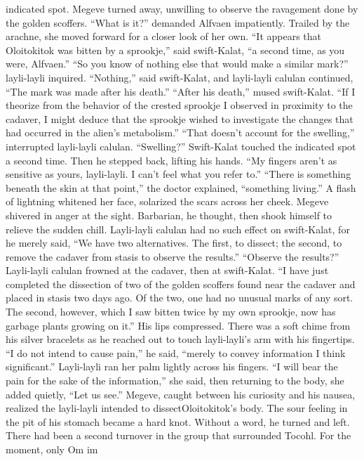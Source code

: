 \documentclass[9pt]{article}
\begin{document}
indicated spot. Megeve turned away, unwilling to observe the ravagement done by the golden scoffers.
“What is it?” demanded Alfvaen impatiently. Trailed by the arachne, she moved forward for a closer
look of her own.
“It appears that Oloitokitok was bitten by a sprookje,” said swift-Kalat, “a second time, as you
were, Alfvaen.”
“So you know of nothing else that would make a similar mark?” layli-layli inquired.
“Nothing,” said swift-Kalat, and layli-layli calulan continued, “The mark was made after his death.”
“After his death,” mused swift-Kalat. “If I theorize from the behavior of the crested sprookje I
observed in proximity to the cadaver, I might deduce that the sprookje wished to investigate the changes
that had occurred in the alien’s metabolism.”
“That doesn’t account for the swelling,” interrupted layli-layli calulan.
“Swelling?” Swift-Kalat touched the indicated spot a second time. Then he stepped back, lifting his
hands. “My fingers aren’t as sensitive as yours, layli-layli. I can’t feel what you refer to.”
“There is something beneath the skin at that point,” the doctor explained, “something living.” A flash
of lightning whitened her face, solarized the scars across her cheek.
Megeve shivered in anger at the sight. Barbarian, he thought, then shook himself to relieve the
sudden chill.
Layli-layli calulan had no such effect on swift-Kalat, for he merely said, “We have two alternatives.
The first, to dissect; the second, to remove the cadaver from stasis to observe the results.”
“Observe the results?” Layli-layli calulan frowned at the cadaver, then at swift-Kalat.
“I have just completed the dissection of two of the golden scoffers found near the cadaver and
placed in stasis two days ago. Of the two, one had no unusual marks of any sort. The second, however,
which I saw bitten twice by my own sprookje, now has garbage plants growing on it.” His lips
compressed. There was a soft chime from his silver bracelets as he reached out to touch layli-layli’s arm
with his fingertips. “I do not intend to cause pain,” he said, “merely to convey information I think
significant.”
Layli-layli ran her palm lightly across his fingers. “I will bear the pain for the sake of the information,”
she said, then returning to the body, she added quietly, “Let us see.”
Megeve, caught between his curiosity and his nausea, realized the layli-layli intended to dissectOloitokitok’s body. The sour feeling in the pit of his stomach became a hard knot. Without a word, he
turned and left.
There had been a second turnover in the group that surrounded Tocohl. For the moment, only Om im
\end{document}
